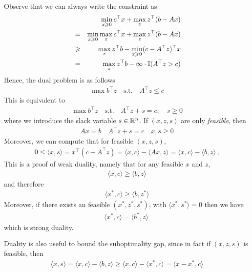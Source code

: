 Observe that we can always write the constraint as 
\begin{eqnarray*}
&& \min_{x \geqslant 0 } c^\top x + \max_{z} z^{\top}(b-Ax) \\
&=& \min_{x \geqslant 0} \max_{z} c^\top x + \max_{z} z^{\top}(b-Ax) \\
&\geqslant& \max_{z} z^{\top}b - \min_{x \geqslant 0} (c - A^{\top}z)^{\top}x\\
&=& \max_{z} z^{\top}b  - \infty \cdot \mathbb I(A^{\top}z > c)\\
\end{eqnarray*}
Hence, the dual problem is as follows
\begin{eqnarray*}
\max b^\top z \quad \text{s.t.}\quad A^{\top} z \le c
\end{eqnarray*}
This is equivalent to 
\begin{eqnarray*}
\max b^\top z \quad \text{s.t.}\quad A^{\top} z + s = c, \quad s \ge 0
\end{eqnarray*}
where we introduce the slack variable $s \in \mathbb{R}^n$. If $(x,z,s)$ are only \emph{feasible}, then 
\begin{eqnarray*}
Ax = b \quad A^{\top} z + s = c \quad x,s \ge 0
\end{eqnarray*}
Moreover, we can compute that for feasible $(x,z,s)$,
\begin{eqnarray*}
0 \le \langle x, s \rangle = x^{\top}(c - A^{\top}z) = \langle x, c \rangle - \langle Ax, z \rangle = \langle x, c \rangle - \langle b,z \rangle~.
\end{eqnarray*}
This is a proof of weak duality, namely that for any feasible $x$ and $z$,
\begin{eqnarray*}
\langle x, c \rangle  \ge \langle b,z \rangle
\end{eqnarray*}
and therefore
\begin{eqnarray*}
\langle x^*, c \rangle  \ge \langle b,z^* \rangle
\end{eqnarray*}
Moreover, if there exists an feasible $(x^*,z^*,s^*)$, with $\langle x^*, s^* \rangle = 0$ then we have 
\begin{eqnarray*}
\langle x^*, c \rangle = \langle b^*,z \rangle~
\end{eqnarray*}
which is strong duality. 

Duality is also useful to bound the suboptimality gap, since in fact if $(x,z,s)$ is feasible, then
\begin{eqnarray*}
\langle x, s \rangle = \langle x, c \rangle - \langle b,z \rangle \ge \langle x,c \rangle - \langle x^*, c \rangle = \langle x - x^* , c \rangle
\end{eqnarray*}

